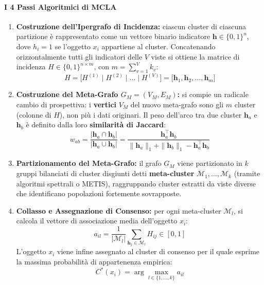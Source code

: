 \FloatBarrier
\paragraph{I 4 Passi Algoritmici di MCLA}
\begin{enumerate}
    \item \textbf{Costruzione dell'Ipergrafo di Incidenza:} ciascun cluster di ciascuna partizione è rappresentato come un vettore binario indicatore $\mathbf{h} \in \{0, 1\}^n$, dove $h_i = 1$ se l'oggetto $x_i$ appartiene al cluster. Concatenando orizzontalmente tutti gli indicatori delle $V$ viste si ottiene la matrice di incidenza $H \in \{0, 1\}^{n \times m}$, con $m = \sum_{v=1}^V k_v$:
    \begin{equation}
        H = \big[ H^{(1)} \mid H^{(2)} \mid \dots \mid H^{(V)} \big] = \big[ \mathbf{h}_1, \mathbf{h}_2, \dots, \mathbf{h}_m \big]
    \end{equation}
    \item \textbf{Costruzione del Meta-Grafo $G_M = (V_M, E_M)$:} si compie un radicale cambio di prospettiva: i \textbf{vertici} $V_M$ del nuovo meta-grafo sono gli $m$ cluster (colonne di $H$), non più i dati originari. Il peso dell'arco tra due cluster $\mathbf{h}_a$ e $\mathbf{h}_b$ è definito dalla loro \textbf{similarità di Jaccard}:
    \begin{equation}
        w_{ab} = \frac{|\mathbf{h}_a \cap \mathbf{h}_b|}{|\mathbf{h}_a \cup \mathbf{h}_b|} = \frac{\mathbf{h}_a^\top \mathbf{h}_b}{\|\mathbf{h}_a\|_1 + \|\mathbf{h}_b\|_1 - \mathbf{h}_a^\top \mathbf{h}_b}
    \end{equation}
    \item \textbf{Partizionamento del Meta-Grafo:} il grafo $G_M$ viene partizionato in $k$ gruppi bilanciati di cluster disgiunti detti \textbf{meta-cluster} $\mathcal{M}_1, \dots, \mathcal{M}_k$ (tramite algoritmi spettrali o METIS), raggruppando cluster estratti da viste diverse che identificano popolazioni fortemente sovrapposte.
    \item \textbf{Collasso e Assegnazione di Consenso:} per ogni meta-cluster $\mathcal{M}_l$, si calcola il vettore di associazione media dell'oggetto $x_i$:
    \begin{equation}
        a_{il} = \frac{1}{|\mathcal{M}_l|} \sum_{\mathbf{h}_j \in \mathcal{M}_l} H_{ij} \in [0, 1]
    \end{equation}
    L'oggetto $x_i$ viene infine assegnato al cluster di consenso per il quale esprime la massima probabilità di appartenenza empirica:
    \begin{equation}
        C^*(x_i) = \arg\max_{l \in \{1, \dots, k\}} a_{il}
    \end{equation}
\end{enumerate}


